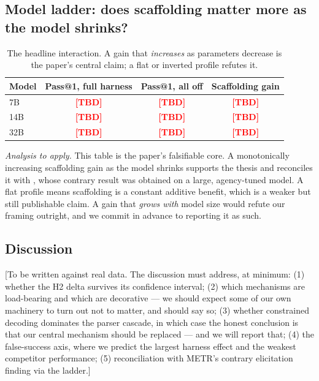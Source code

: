 \documentclass[11pt,a4paper]{article}
\newcommand{\tbd}{\textcolor{red}{\textbf{[TBD]}}}
\newcommand{\note}[1]{\textcolor{red!70!black}{\small\textsf{[#1]}}}
\begin{document}
\subsection{Model ladder: does scaffolding matter more as the model shrinks?}

\begin{table}[h]
\centering
\small
\begin{tabular}{@{}lccc@{}}
\toprule
\textbf{Model} & \textbf{Pass@1, full harness} & \textbf{Pass@1, all off} &
\textbf{Scaffolding gain} \\
\midrule
7B  & \tbd & \tbd & \tbd \\
14B & \tbd & \tbd & \tbd \\
32B & \tbd & \tbd & \tbd \\
\bottomrule
\end{tabular}
\caption{The headline interaction. A gain that \emph{increases} as parameters
decrease is the paper's central claim; a flat or inverted profile refutes it.}
\label{tab:ladder}
\end{table}

\noindent\emph{Analysis to apply.} This table is the paper's falsifiable core. A
monotonically increasing scaffolding gain as the model shrinks supports the
thesis and reconciles it with \citet{metr2024elicitation}, whose contrary result
was obtained on a large, agency-tuned model. A flat profile means scaffolding is
a constant additive benefit, which is a weaker but still publishable claim. A
gain that \emph{grows with} model size would refute our framing outright, and we
commit in advance to reporting it as such.

\subsection{Discussion}

\note{To be written against real data. The discussion must address, at minimum:
(1) whether the H2 delta survives its confidence interval;
(2) which mechanisms are load-bearing and which are decorative --- we should
expect some of our own machinery to turn out not to matter, and should say so;
(3) whether constrained decoding dominates the parser cascade, in which case the
honest conclusion is that our central mechanism should be replaced --- and we
will report that;
(4) the false-success axis, where we predict the largest harness effect and the
weakest competitor performance;
(5) reconciliation with METR's contrary elicitation finding via the ladder.}
\end{document}

